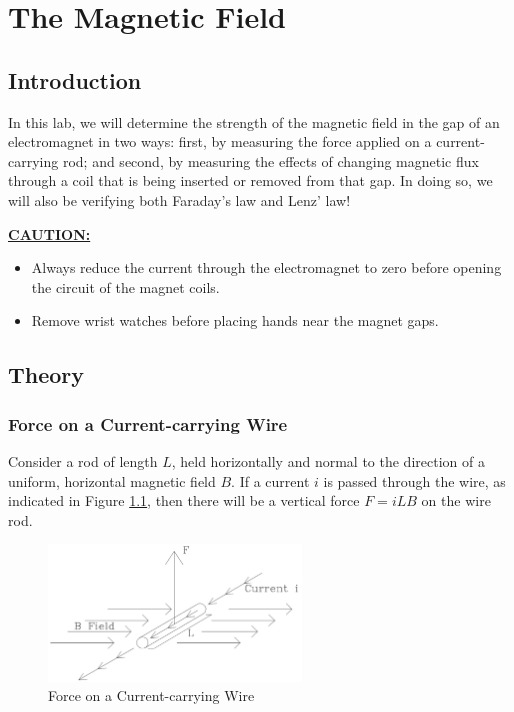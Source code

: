 \chapter{The Magnetic Field}

\section{Introduction}

In this lab, we will determine the strength of the magnetic field in the gap of an electromagnet in two ways: first, by measuring the force applied on a current-carrying rod; and second, by measuring the effects of changing magnetic flux through a coil that is being inserted or removed from that gap. In doing so, we will also be verifying both Faraday's law and Lenz' law! \myskip

\underline{\textbf{CAUTION:}}
\begin{itemize}
 \item Always reduce the current through the electromagnet to zero before opening the circuit of the magnet coils.
 \item Remove wrist watches before placing hands near the magnet gaps.
\end{itemize}

\section{Theory}
\subsection{Force on a Current-carrying Wire}
Consider a rod of length $L$, held horizontally and normal to the direction of a uniform, horizontal magnetic field $B$. If a current $i$ is passed through the wire, as indicated in Figure {\ref{fig:force}}, then there will be a vertical force $F=iLB$ on the wire rod.
\begin{figure}[h]
\centering
\includegraphics[width=0.6\textwidth]{./Exp4/pic/image1.png}
\caption{Force on a Current-carrying Wire}
\label{fig:force}
\end{figure}

